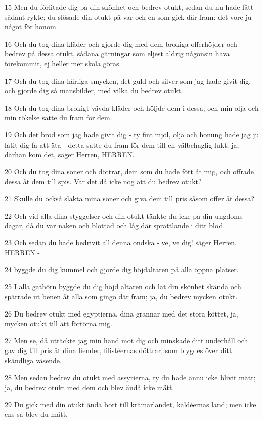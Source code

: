 \par 15 Men du förlitade dig på din skönhet och bedrev otukt, sedan du nu hade fått sådant rykte; du slösade din otukt på var och en som gick där fram: det vore ju något för honom.
\par 16 Och du tog dina kläder och gjorde dig med dem brokiga offerhöjder och bedrev på dessa otukt, sådana gärningar som eljest aldrig någonsin hava förekommit, ej heller mer skola göras.
\par 17 Och du tog dina härliga smycken, det guld och silver som jag hade givit dig, och gjorde dig så mansbilder, med vilka du bedrev otukt.
\par 18 Och du tog dina brokigt vävda kläder och höljde dem i dessa; och min olja och min rökelse satte du fram för dem.
\par 19 Och det bröd som jag hade givit dig - ty fint mjöl, olja och honung hade jag ju låtit dig få att äta - detta satte du fram för dem till en välbehaglig lukt; ja, därhän kom det, säger Herren, HERREN.
\par 20 Och du tog dina söner och döttrar, dem som du hade fött åt mig, och offrade dessa åt dem till spis. Var det då icke nog att du bedrev otukt?
\par 21 Skulle du också slakta mina söner och giva dem till pris såsom offer åt dessa?
\par 22 Och vid alla dina styggelser och din otukt tänkte du icke på din ungdoms dagar, då du var naken och blottad och låg där sprattlande i ditt blod.
\par 23 Och sedan du hade bedrivit all denna ondska - ve, ve dig! säger Herren, HERREN -
\par 24 byggde du dig kummel och gjorde dig höjdaltaren på alla öppna platser.
\par 25 I alla gathörn byggde du dig höjd altaren och lät din skönhet skända och spärrade ut benen åt alla som gingo där fram; ja, du bedrev mycken otukt.
\par 26 Du bedrev otukt med egyptierna, dina grannar med det stora köttet, ja, mycken otukt till att förtörna mig.
\par 27 Men se, då uträckte jag min hand mot dig och minskade ditt underhåll och gav dig till pris åt dina fiender, filistéernas döttrar, som blygdes över ditt skändliga väsende.
\par 28 Men sedan bedrev du otukt med assyrierna, ty du hade ännu icke blivit mätt; ja, du bedrev otukt med dem och blev ändå icke mätt.
\par 29 Du gick med din otukt ända bort till krämarlandet, kaldéernas land; men icke ens så blev du mätt.
